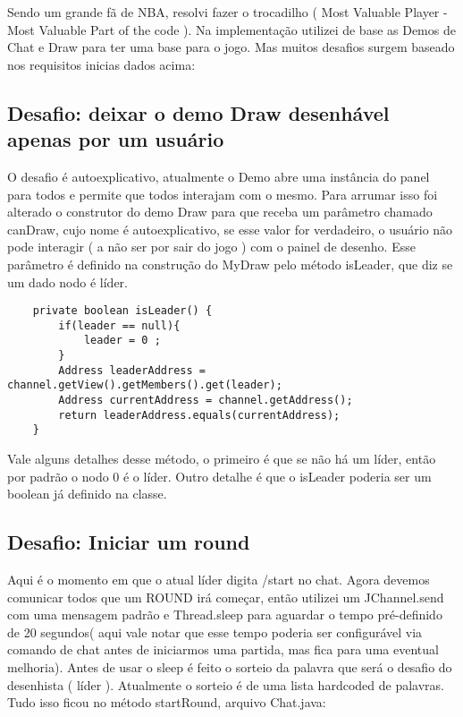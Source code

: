 \documentclass{article}
\begin{document}
Sendo um grande fã de NBA, resolvi fazer o trocadilho ( Most Valuable Player - Most Valuable Part of the code ). Na implementação utilizei de base as Demos de Chat e Draw para ter uma base para o jogo. Mas muitos desafios surgem baseado nos requisitos inicias dados acima:


\subsection{Desafio: deixar o demo Draw desenhável apenas por um usuário}

O desafio é autoexplicativo, atualmente o Demo abre uma instância do panel para todos e permite que todos interajam com o mesmo. Para arrumar isso foi alterado o construtor do demo Draw para que receba um parâmetro chamado canDraw, cujo nome é autoexplicativo, se esse valor for verdadeiro, o usuário não pode interagir ( a não ser por sair do jogo ) com o painel de desenho. Esse parâmetro é definido na construção do MyDraw pelo método isLeader, que diz se um dado nodo é líder.


\begin{lstlisting} 
    private boolean isLeader() {
        if(leader == null){
            leader = 0 ;
        }
        Address leaderAddress = channel.getView().getMembers().get(leader);
        Address currentAddress = channel.getAddress();
        return leaderAddress.equals(currentAddress);
    }
\end{lstlisting} 
 Vale alguns detalhes desse método, o primeiro é que se não há um líder, então por padrão o nodo 0 é o líder. Outro detalhe é que o isLeader poderia ser um boolean já definido na classe. 
 
 
\subsection{Desafio: Iniciar um round }
 Aqui é o momento em que o atual líder digita /start no chat. Agora devemos comunicar todos que um ROUND irá começar, então utilizei um JChannel.send com uma mensagem padrão e Thread.sleep para aguardar o tempo pré-definido de 20 segundos( aqui vale notar que esse tempo poderia ser configurável via comando de chat antes de iniciarmos uma partida, mas fica para uma eventual melhoria). Antes de usar o sleep é feito o sorteio da palavra que será o desafio do desenhista ( líder ). Atualmente o sorteio é de uma lista hardcoded de palavras. Tudo isso ficou no método startRound, arquivo Chat.java:
 
\end{document}
